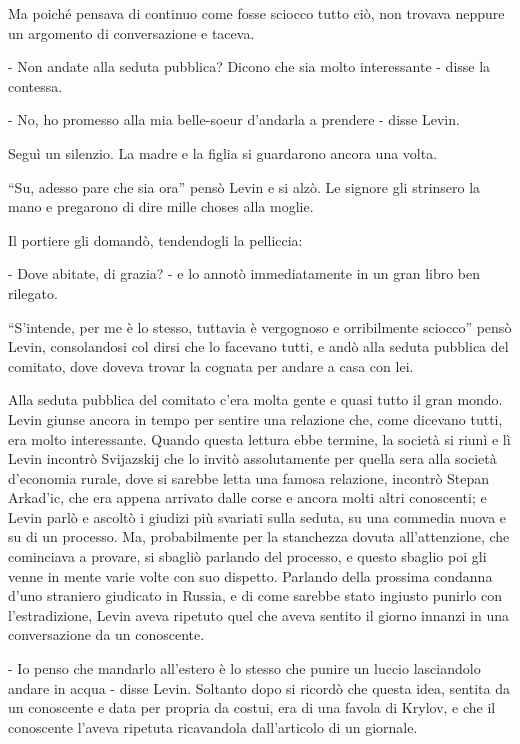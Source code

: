 Ma poiché pensava di continuo come fosse sciocco tutto ciò, non trovava neppure un argomento di conversazione e taceva. 

- Non andate alla seduta pubblica? Dicono che sia molto interessante - disse la contessa. 

- No, ho promesso alla mia belle-soeur d'andarla a prendere - disse Levin. 

Seguì un silenzio. La madre e la figlia si guardarono ancora una volta. 

``Su, adesso pare che sia ora'' pensò Levin e si alzò. Le signore gli strinsero la mano e pregarono di dire mille choses alla moglie. 

Il portiere gli domandò, tendendogli la pelliccia: 

- Dove abitate, di grazia? - e lo annotò immediatamente in un gran libro ben rilegato. 

``S'intende, per me è lo stesso, tuttavia è vergognoso e orribilmente sciocco'' pensò Levin, consolandosi col dirsi che lo facevano tutti, e andò alla seduta pubblica del comitato, dove doveva trovar la cognata per andare a casa con lei. 

Alla seduta pubblica del comitato c'era molta gente e quasi tutto il gran mondo. Levin giunse ancora in tempo per sentire una relazione che, come dicevano tutti, era molto interessante. Quando questa lettura ebbe termine, la società si riunì e lì Levin incontrò Svijazskij che lo invitò assolutamente per quella sera alla società d'economia rurale, dove si sarebbe letta una famosa relazione, incontrò Stepan Arkad'ic, che era appena arrivato dalle corse e ancora molti altri conoscenti; e Levin parlò e ascoltò i giudizi più svariati sulla seduta, su una commedia nuova e su di un processo. Ma, probabilmente per la stanchezza dovuta all'attenzione, che cominciava a provare, si sbagliò parlando del processo, e questo sbaglio poi gli venne in mente varie volte con suo dispetto. Parlando della prossima condanna d'uno straniero giudicato in Russia, e di come sarebbe stato ingiusto punirlo con l'estradizione, Levin aveva ripetuto quel che aveva sentito il giorno innanzi in una conversazione da un conoscente. 

- Io penso che mandarlo all'estero è lo stesso che punire un luccio lasciandolo andare in acqua - disse Levin. Soltanto dopo si ricordò che questa idea, sentita da un conoscente e data per propria da costui, era di una favola di Krylov, e che il conoscente l'aveva ripetuta ricavandola dall'articolo di un giornale. 

